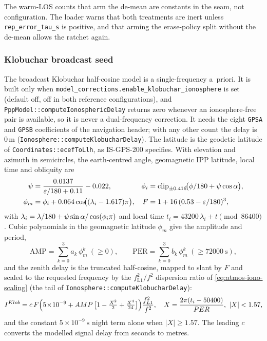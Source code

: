 \documentclass[main.tex]{subfiles}
\begin{document}
The warm-LOS counts that arm the de-mean are constants in the seam, not
configuration.  The loader warns that both treatments are inert unless
\texttt{rep\_error\_tau\_s} is positive, and that arming the erase-policy
split without the de-mean allows the ratchet again.

\subsubsection{Klobuchar broadcast seed}

The broadcast Klobuchar half-cosine model
\cite{klobuchar1987ionospheric} is a single-frequency a~priori.  It is
built only when \texttt{model\_corrections.enable\_klobuchar\_ionosphere}
is set (default off, off in both reference configurations), and
\texttt{PppModel::computeIonosphericDelay} returns zero whenever an
ionosphere-free pair is available, so it is never a dual-frequency
correction.  It needs the eight \texttt{GPSA} and \texttt{GPSB}
coefficients of the navigation header; with any other count the delay is
$0$\,m (\texttt{Ionosphere::computeKlobucharDelay}).  The latitude is the
geodetic latitude of \texttt{Coordinates::ecefToLlh}, as IS-GPS-200
specifies.  With
elevation and azimuth in semicircles, the earth-centred angle, geomagnetic
IPP latitude, local time and obliquity are
\begin{align}
\psi &= \frac{0.0137}{\elev/180 + 0.11} - 0.022, &
\phi_i &= \operatorname{clip}_{\pm 0.416}\!\bigl(\phi/180 + \psi\cos\azim\bigr),
\label{eq:atmos-klob-psi}\\
\phi_m &= \phi_i + 0.064\cos\!\bigl((\lambda_i - 1.617)\pi\bigr), &
F &= 1 + 16\,(0.53 - \elev/180)^3,
\label{eq:atmos-klob-geom}
\end{align}
with $\lambda_i = \lambda/180 + \psi\sin\azim/\cos(\phi_i\pi)$ and local
time $t_i = 43200\,\lambda_i + t \pmod{86400}$.  Cubic polynomials in the
geomagnetic latitude $\phi_m$ give the amplitude and period,
\begin{equation}
\mathrm{AMP} = \sum_{k=0}^{3} a_k\,\phi_m^k\ (\ge 0),
\qquad
\mathrm{PER} = \sum_{k=0}^{3} b_k\,\phi_m^k\ (\ge 72000~\mathrm s),
\label{eq:atmos-klob-amp}
\end{equation}
and the zenith delay is the truncated half-cosine, mapped to slant by $F$
and scaled to the requested frequency by the $f_{\mathrm{L1}}^2/f^2$
dispersion ratio of \eqref{eq:atmos-iono-scaling}
(the tail of \texttt{Ionosphere::computeKlobucharDelay}):
\begin{equation}
I^{\mathrm{Klob}} = c\,F\Bigl(5\!\times\!10^{-9}
   + \mathrm{AMP}\,\bigl[1 - \tfrac{X^2}{2} + \tfrac{X^4}{24}\bigr]\Bigr)
   \frac{f_{\mathrm{L1}}^2}{f^2},
\quad X = \frac{2\pi (t_i - 50400)}{\mathrm{PER}},\ |X|<1.57,
\label{eq:atmos-klob-delay}
\end{equation}
and the constant $5\!\times\!10^{-9}~\mathrm s$ night term alone when
$|X|\ge 1.57$.  The leading $c$ converts the modelled signal delay from
seconds to metres.
\end{document}
